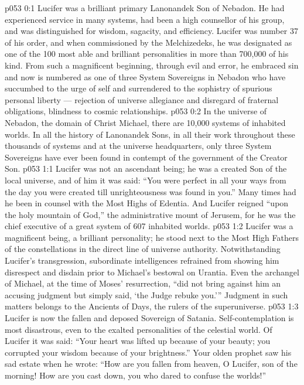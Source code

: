 \author{Manovandet Melchizedek}
\vs p053 0:1 Lucifer was a brilliant primary Lanonandek Son of Nebadon. He had experienced service in many systems, had been a high counsellor of his group, and was distinguished for wisdom, sagacity, and efficiency. Lucifer was number 37 of his order, and when commissioned by the Melchizedeks, he was designated as one of the 100 most able and brilliant personalities in more than 700,000 of his kind. From such a magnificent beginning, through evil and error, he embraced sin and now is numbered as one of three System Sovereigns in Nebadon who have succumbed to the urge of self and surrendered to the sophistry of spurious personal liberty --- rejection of universe allegiance and disregard of fraternal obligations, blindness to cosmic relationships.
\vs p053 0:2 In the universe of Nebadon, the domain of Christ Michael, there are 10,000 systems of inhabited worlds. In all the history of Lanonandek Sons, in all their work throughout these thousands of systems and at the universe headquarters, only three System Sovereigns have ever been found in contempt of the government of the Creator Son.
\vs p053 1:1 Lucifer was not an ascendant being; he was a created Son of the local universe, and of him it was said: “You were perfect in all your ways from the day you were created till unrighteousness was found in you.” Many times had he been in counsel with the Most Highs of Edentia. And Lucifer reigned “upon the holy mountain of God,” the administrative mount of Jerusem, for he was the chief executive of a great system of 607 inhabited worlds.
\vs p053 1:2 Lucifer was a magnificent being, a brilliant personality; he stood next to the Most High Fathers of the constellations in the direct line of universe authority. Notwithstanding Lucifer’s transgression, subordinate intelligences refrained from showing him disrespect and disdain prior to Michael’s bestowal on Urantia. Even the archangel of Michael, at the time of Moses’ resurrection, “did not bring against him an accusing judgment but simply said, ‘the Judge rebuke you.’” Judgment in such matters belongs to the Ancients of Days, the rulers of the superuniverse.
\vs p053 1:3 Lucifer is now the fallen and deposed Sovereign of Satania. Self\hyp{}contemplation is most disastrous, even to the exalted personalities of the celestial world. Of Lucifer it was said: “Your heart was lifted up because of your beauty; you corrupted your wisdom because of your brightness.” Your olden prophet saw his sad estate when he wrote: “How are you fallen from heaven, O Lucifer, son of the morning! How are you cast down, you who dared to confuse the worlds!”
